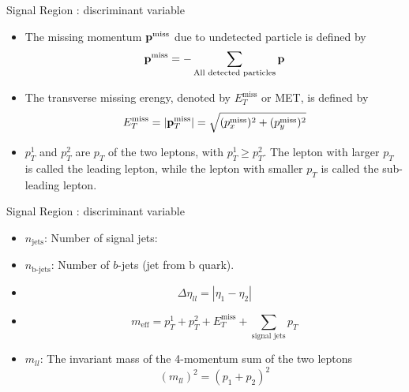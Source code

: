 \documentclass[mathserif,serif]{beamer}
\begin{document}
\begin{frame}{Signal Region : discriminant variable}
\begin{itemize}
\item The missing momentum ${\bf p}^{\text{miss}}$ due to undetected particle is defined by
\begin{equation*}
{\bf p}^{\text{miss}} = - \sum_{\text{All detected particles}}{\bf p}
\end{equation*}
\item The transverse missing erengy, denoted by $E_{T}^{\text{miss}}$ or MET, is defined by
\begin{equation*}
E_{T}^{\text{miss}} = |{\bf p}_T^{\text{miss}}| = \sqrt{ (p_x^{\text{miss}})^2 + (p_y^{\text{miss}})^2}
\end{equation*}
\item $p_T^1$ and $p_T^2$ are $p_T$ of the two leptons, with $p_T^1 \geq p_T^2$. The lepton with larger $p_T$ is called the leading lepton, while the lepton with smaller $p_T$ is called the sub-leading lepton.
\end{itemize}
\end{frame}

\begin{frame}{Signal Region : discriminant variable}
\begin{itemize}
\item $n_{\text{jets}}$: Number of signal jets:
\item $n_{\text{b-jets}}$: Number of $b$-jets (jet from b quark).
\item
\begin{equation*}
\Delta \eta_{ll} = |\eta_{1} - \eta_{2}|
\end{equation*}
\item
\begin{equation*}
m_{\text{eff}} = p_T^1 + p_T^2 + E_T^{\text{miss}} + \sum_{\text {signal jets}} p_T
\end{equation*}
\item $m_{ll}$: The invariant mass of the 4-momentum sum of the two leptons
\begin{equation*}
(m_{ll})^2 = (p_1 + p_2)^2
\end{equation*}
\end{itemize}
\end{frame}
\end{document}
